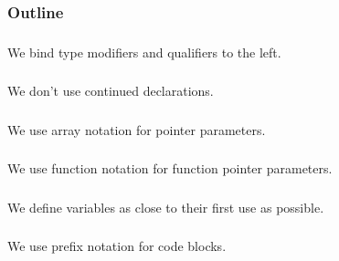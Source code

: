 \documentclass{../c-lecture}
\subtitle{Buckle Up}
\begin{document}
\begin{frame}
  \titlepage{}
\end{frame}
\begin{frame}
  \frametitle{Outline}
  \tableofcontents{}
\end{frame}

\begin{frame}
  \frametitle{}
  \begin{block}{}
    We bind type modifiers and qualifiers to the left.
  \end{block}
\end{frame}

\begin{frame}
  \frametitle{}
  \begin{block}{}
    We don't use continued declarations.
  \end{block}
\end{frame}

\begin{frame}
  \frametitle{}
  \begin{block}{}
    We use array notation for pointer parameters.
  \end{block}
\end{frame}

\begin{frame}
  \frametitle{}
  \begin{block}{}
    We use function notation for function pointer parameters.
  \end{block}
\end{frame}

\begin{frame}
  \frametitle{}
  \begin{block}{}
    We define variables as close to their first use as possible.
  \end{block}
\end{frame}

\begin{frame}
  \frametitle{}
  \begin{block}{}
    We use prefix notation for code blocks.
  \end{block}
\end{frame}
\end{document}
